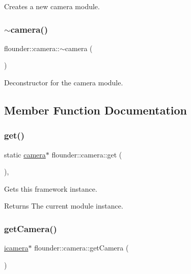 Creates a new camera module. 

\mbox{\label{classflounder_1_1camera_ada55d236f9f9b9a301b3fd747d15d4d0}} 
\subsubsection{\texorpdfstring{$\sim$camera()}{~camera()}}
{\footnotesize\ttfamily flounder\+::camera\+::$\sim$camera (\begin{DoxyParamCaption}{ }\end{DoxyParamCaption})}



Deconstructor for the camera module. 



\subsection{Member Function Documentation}
\mbox{\label{classflounder_1_1camera_a3ea117d355e4925fa5238bae5e6e46b1}} 
\subsubsection{\texorpdfstring{get()}{get()}}
{\footnotesize\ttfamily static \hyperlink{classflounder_1_1camera}{camera}$\ast$ flounder\+::camera\+::get (\begin{DoxyParamCaption}{ }\end{DoxyParamCaption})\hspace{0.3cm}{\ttfamily [inline]}, {\ttfamily [static]}}



Gets this framework instance. 

\begin{DoxyReturn}{Returns}
The current module instance. 
\end{DoxyReturn}
\mbox{\label{classflounder_1_1camera_abc16dba0c44428f99ce65af2c1dac5b8}} 
\subsubsection{\texorpdfstring{get\+Camera()}{getCamera()}}
{\footnotesize\ttfamily \hyperlink{classflounder_1_1icamera}{icamera}$\ast$ flounder\+::camera\+::get\+Camera (\begin{DoxyParamCaption}{ }\end{DoxyParamCaption})\hspace{0.3cm}{\ttfamily [inline]}}



